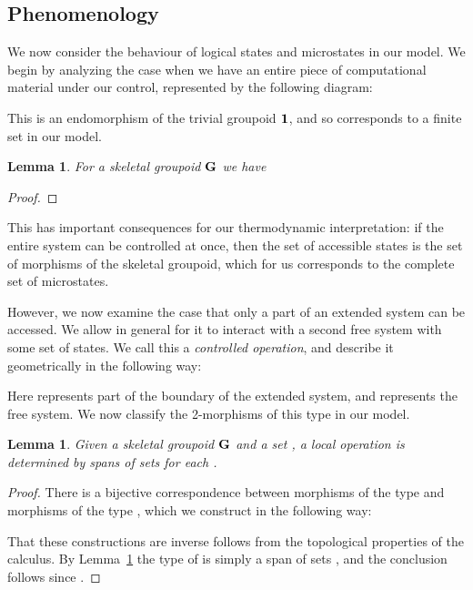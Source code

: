\documentclass[a4paper,12pt]{article}
\newtheorem{lemma}[theorem]{Lemma}
\theoremstyle{definition}
\newcommand\cat[1]{{\ensuremath{\bf #1}}}
\renewcommand{\-}[0]{\nobreakdash-\hspace{0pt}}
\def\innerboxsep{3pt}
\begin{document}
\subsection{Phenomenology}
\label{sec:phenomenology}

\noindent
We now consider the behaviour of logical states and microstates in our model. We begin by analyzing the case when we have an entire piece of computational material under our control, represented by the following diagram:
\def\innerboxsep{3pt}

This is an endomorphism of the trivial groupoid \cat 1, and so corresponds to a finite set in our model.
\begin{lemma}
\label{lem:microstates}
For a skeletal groupoid \cat G we have 
\end{lemma}
\begin{proof}
\end{proof}

\noindent
This has important consequences for our thermodynamic interpretation: if the entire system can be controlled at once, then the set of accessible states is the set of morphisms of the skeletal groupoid, which for us corresponds to the complete set of microstates.

However, we now examine the case that only a part of an extended system can be accessed. We allow in general for it to interact with a second free system with some set  of states. We call this a \textit{controlled operation}, and describe it geometrically in the following way:
\def\innerboxsep{3pt}

Here  represents part of the boundary of the extended system, and  represents the free system. We now classify the 2\-morphisms of this type in our model.
\begin{lemma}
\label{lem:controlled}
Given a skeletal groupoid \cat G and a set , a local operation  is determined by spans of sets  for each .
\end{lemma} 
\begin{proof}
There is a bijective correspondence between morphisms of the type  and morphisms of the type , which we construct in the following way:


That these constructions are inverse follows from the topological properties of the calculus. By Lemma~\ref{lem:microstates} the type of  is simply a span of sets , and the conclusion follows since .
\end{proof}
\end{document}
